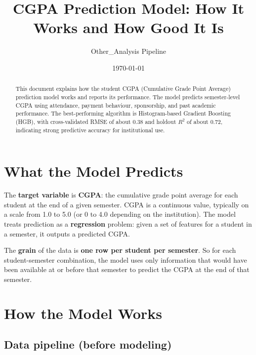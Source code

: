 \documentclass[12pt,a4paper]{article}
\title{CGPA Prediction Model: How It Works and How Good It Is}
\author{Other\_Analysis Pipeline}
\date{\today}
\begin{document}
\maketitle

\begin{abstract}
This document explains how the student CGPA (Cumulative Grade Point Average) prediction model works and reports its performance. The model predicts semester-level CGPA using attendance, payment behaviour, sponsorship, and past academic performance. The best-performing algorithm is Histogram-based Gradient Boosting (HGB), with cross-validated RMSE of about 0.38 and holdout \(R^2\) of about 0.72, indicating strong predictive accuracy for institutional use.
\end{abstract}

\tableofcontents
\newpage

\section{What the Model Predicts}

The \textbf{target variable} is \textbf{CGPA}: the cumulative grade point average for each student at the end of a given semester. CGPA is a continuous value, typically on a scale from 1.0 to 5.0 (or 0 to 4.0 depending on the institution). The model treats prediction as a \textbf{regression} problem: given a set of features for a student in a semester, it outputs a predicted CGPA.

The \textbf{grain} of the data is \textbf{one row per student per semester}. So for each student-semester combination, the model uses only information that would have been available at or before that semester to predict the CGPA at the end of that semester.

\section{How the Model Works}

\subsection{Data pipeline (before modeling)}
\end{document}
